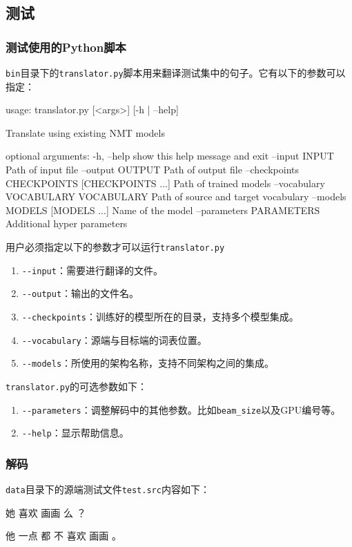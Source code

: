 \documentclass{article}
\begin{document}
\subsection{测试}
\subsubsection{测试使用的Python脚本}
\verb|bin|目录下的\verb|translator.py|脚本用来翻译测试集中的句子。它有以下的参数可以指定：

\begin{everbatim}
usage: translator.py [<args>] [-h | --help]

Translate using existing NMT models

optional arguments:
  -h, --help            show this help message and exit
  --input INPUT         Path of input file
  --output OUTPUT       Path of output file
  --checkpoints CHECKPOINTS [CHECKPOINTS ...]
                        Path of trained models
  --vocabulary VOCABULARY VOCABULARY
                        Path of source and target vocabulary
  --models MODELS [MODELS ...]
                        Name of the model
  --parameters PARAMETERS
                        Additional hyper parameters
\end{everbatim}

用户必须指定以下的参数才可以运行\verb|translator.py|

\begin{enumerate}
\item \verb|--input|：需要进行翻译的文件。
\item \verb|--output|：输出的文件名。
\item \verb|--checkpoints|：训练好的模型所在的目录，支持多个模型集成。
\item \verb|--vocabulary|：源端与目标端的词表位置。
\item \verb|--models|：所使用的架构名称，支持不同架构之间的集成。
\end{enumerate}

\verb|translator.py|的可选参数如下：
\begin{enumerate}
\item \verb|--parameters|：调整解码中的其他参数。比如\verb|beam_size|以及GPU编号等。
\item \verb|--help|：显示帮助信息。
\end{enumerate}

\subsubsection{解码}
\verb|data|目录下的源端测试文件\verb|test.src|内容如下：
\begin{everbatim}
她 喜欢 画画 么 ？

他 一点 都 不 喜欢 画画 。

\end{everbatim}
\end{document}
